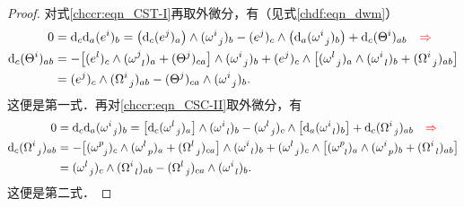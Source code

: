 \begin{proof}
    对式\eqref{chccr:eqn_CST-I}再取外微分，有（见式\eqref{chdf:eqn_dwm}）
    \setlength{\mathindent}{0em}
    \begin{align*}
        0 & = {\rm d}_c {\rm d}_a (e^i)_b =
        \bigl({\rm d}_c (e^j)_a\bigr) \wedge (\omega _{\hphantom{a} j}^i)_b
        -  (e^j)_c  \wedge \bigl({\rm d}_a(\omega _{\hphantom{a} j}^i)_b\bigr)
        +{\rm d}_c (\Theta ^{i})_{ab} \quad  {\color{red} \Rightarrow} \\
        {\rm d}_c (\Theta ^{i})_{ab} &=  -
        \bigl [(e^l)_c \wedge (\omega _{\hphantom{a} l}^j)_a +(\Theta ^{j})_{ca} \bigr]
        \wedge (\omega _{\hphantom{a} j}^i)_b +  (e^j)_c  \wedge
        \bigl[ ( \omega _{\hphantom{a} j}^l )_a \wedge
        ( \omega _{\hphantom{a} l}^i )_b + (\Omega_{\hphantom{a} j} ^{i})_{ab} \bigr] \\
        &= (e^j)_c \wedge(\Omega_{\hphantom{a} j} ^{i})_{ab}
        -(\Theta ^{j})_{ca} \wedge (\omega _{\hphantom{a} j}^i)_b .
    \end{align*} %
    这便是第一式．再对\eqref{chccr:eqn_CSC-II}取外微分，有
    \begin{align*}
        0 & = {\rm d}_c{\rm d}_a ( \omega _{\hphantom{a} j} ^i  )_b =
        \bigl[{\rm d}_c ( \omega _{\hphantom{a} j}^l )_a \bigr]
        \wedge ( \omega _{\hphantom{a} l}^i )_b
        -( \omega _{\hphantom{a} j}^l )_c   \wedge
        \bigl[ {\rm d}_a ( \omega _{\hphantom{a} l}^i )_b \bigr]
        + {\rm d}_c (\Omega_{\hphantom{a} j} ^{i})_{ab} \quad  {\color{red} \Rightarrow} \\
        {\rm d}_c (\Omega_{\hphantom{a} j} ^{i})_{ab} &=
        -\bigl[( \omega _{\hphantom{a} j}^p )_c
        \wedge ( \omega _{\hphantom{a} p}^l )_a + (\Omega_{\hphantom{a} j} ^{l})_{ca} \bigr]
        \wedge ( \omega _{\hphantom{a} l}^i )_b +
        ( \omega _{\hphantom{a} j}^l )_c   \wedge
        \bigl[ ( \omega _{\hphantom{a} l}^p )_a
        \wedge ( \omega _{\hphantom{a} p}^i )_b + (\Omega_{\hphantom{a} l} ^{i})_{ab} \bigr] \\
        & = ( \omega _{\hphantom{a} j}^l )_c   \wedge (\Omega_{\hphantom{a} l} ^{i})_{ab}
        - (\Omega_{\hphantom{a} j} ^{l})_{ca}\wedge ( \omega _{\hphantom{a} l}^i )_b .
    \end{align*}\setlength{\mathindent}{2em}
    这便是第二式．
\end{proof}

